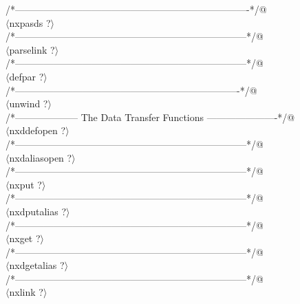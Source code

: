 \documentclass[12pt]{article}
\begin{document}
{\begin{flushleft}
\begin{minipage}{\linewidth}
\begin{list}{}{}
\mbox{}\verb@/*-------------------------------------------------------------------------*/@\\
\mbox{}\verb@@$\langle$nxpasds {\footnotesize ?}$\rangle$\verb@@\\
\mbox{}\verb@/*------------------------------------------------------------------------*/@\\
\mbox{}\verb@@$\langle$parselink {\footnotesize ?}$\rangle$\verb@@\\
\mbox{}\verb@/*------------------------------------------------------------------------*/@\\
\mbox{}\verb@@$\langle$defpar {\footnotesize ?}$\rangle$\verb@@\\
\mbox{}\verb@/*----------------------------------------------------------------------*/@\\
\mbox{}\verb@@$\langle$unwind {\footnotesize ?}$\rangle$\verb@@\\
\mbox{}\verb@/*-------------------- The Data Transfer Functions ----------------------*/@\\
\mbox{}\verb@@$\langle$nxddefopen {\footnotesize ?}$\rangle$\verb@@\\
\mbox{}\verb@/*------------------------------------------------------------------------*/@\\
\mbox{}\verb@@$\langle$nxdaliasopen {\footnotesize ?}$\rangle$\verb@@\\
\mbox{}\verb@/*------------------------------------------------------------------------*/@\\
\mbox{}\verb@@$\langle$nxput {\footnotesize ?}$\rangle$\verb@@\\
\mbox{}\verb@/*------------------------------------------------------------------------*/@\\
\mbox{}\verb@@$\langle$nxdputalias {\footnotesize ?}$\rangle$\verb@@\\
\mbox{}\verb@/*------------------------------------------------------------------------*/@\\
\mbox{}\verb@@$\langle$nxget {\footnotesize ?}$\rangle$\verb@@\\
\mbox{}\verb@/*------------------------------------------------------------------------*/@\\
\mbox{}\verb@@$\langle$nxdgetalias {\footnotesize ?}$\rangle$\verb@@\\
\mbox{}\verb@/*------------------------------------------------------------------------*/@\\
\mbox{}\verb@@$\langle$nxlink {\footnotesize ?}$\rangle$\verb@@\\

\end{list}
\end{minipage}
\end{flushleft}}
\end{document}
